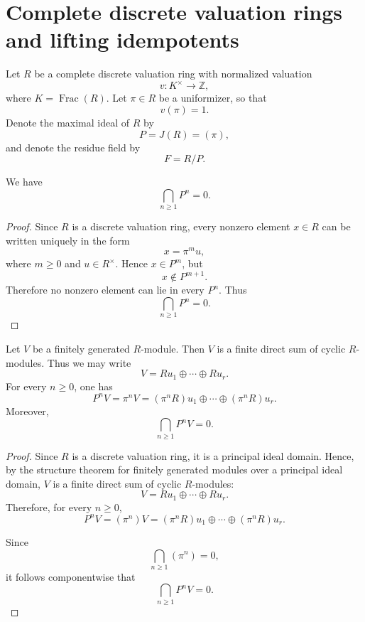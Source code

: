 \section{Complete discrete valuation rings and lifting idempotents}

    Let \(R\) be a complete discrete valuation ring with normalized valuation
    \[
        v:K^\times \longrightarrow \mathbb{Z},
    \]
    where \(K=\operatorname{Frac}(R)\). Let \(\pi\in R\) be a uniformizer, so that
    \[
        v(\pi)=1.
    \]
    Denote the maximal ideal of \(R\) by
    \[
        P=J(R)=(\pi),
    \]
    and denote the residue field by
    \[
        F=R/P.
    \]

\begin{lemma}
    We have
    \[
        \bigcap_{n\geq 1} P^n=0.
    \]
\end{lemma}

\begin{proof}
    Since \(R\) is a discrete valuation ring, every nonzero element \(x\in R\) can be
    written uniquely in the form
    \[
        x=\pi^m u,
    \]
    where \(m\geq 0\) and \(u\in R^\times\). Hence \(x\in P^m\), but
    \[
        x\notin P^{m+1}.
    \]
    Therefore no nonzero element can lie in every \(P^n\). Thus
    \[
        \bigcap_{n\geq 1}P^n=0.
    \]
\end{proof}

\begin{proposition}
    Let \(V\) be a finitely generated \(R\)-module. Then \(V\) is a finite direct sum
    of cyclic \(R\)-modules. Thus we may write
    \[
        V=Ru_1\oplus \cdots \oplus Ru_r.
    \]
    For every \(n\geq 0\), one has
    \[
        P^nV=\pi^n V
        =
        (\pi^n R)u_1\oplus \cdots \oplus (\pi^n R)u_r.
    \]
    Moreover,
    \[
        \bigcap_{n\geq 1}P^nV=0.
    \]
\end{proposition}

\begin{proof}
    Since \(R\) is a discrete valuation ring, it is a principal ideal domain. Hence, by
    the structure theorem for finitely generated modules over a principal ideal domain,
    \(V\) is a finite direct sum of cyclic \(R\)-modules:
    \[
        V=Ru_1\oplus \cdots \oplus Ru_r.
    \]
    Therefore, for every \(n\geq 0\),
    \[
        P^nV=(\pi^n)V
        =
        (\pi^n R)u_1\oplus \cdots \oplus (\pi^n R)u_r.
    \]

    Since
    \[
        \bigcap_{n\geq 1}(\pi^n)=0,
    \]
    it follows componentwise that
    \[
        \bigcap_{n\geq 1}P^nV=0.
    \]
\end{proof}

